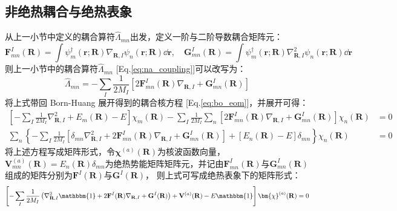 \subsection{非绝热耦合与绝热表象}
从上一小节中定义的耦合算符$\hat{\Lambda}_{mn}$出发，定义一阶与二阶导数耦合矩阵元：
\[\mathbf{F}^I_{mn}(\mathbf{R})=\int\psi_m^{\dagger}(\mathbf{r};\mathbf{R})\nabla_{\mathbf{R},I}\psi_n(\mathbf{r};\mathbf{R})\dd{\mathbf{r}}, \quad \mathbf{G}^I_{mn}(\mathbf{R})=\int\psi_m^{\dagger}(\mathbf{r};\mathbf{R})\nabla_{\mathbf{R},I}^2\psi_n(\mathbf{r};\mathbf{R})\dd{\mathbf{r}}\]
则上一小节中的耦合算符$\hat{\Lambda}_{mn}$ [Eq.\eqref{eq:na_coupling}]可以改写为：
\[\hat{\Lambda}_{mn}=-\sum_I\frac{1}{2M_I}\left[2\mathbf{F}^I_{mn}(\mathbf{R})\nabla_{\mathbf{R},I}+\mathbf{G}^I_{mn}(\mathbf{R})\right]\]
将上式带回 Born-Huang 展开得到的耦合核方程 [Eq.\eqref{eq:bo_eom}]，并展开可得：
\[\begin{aligned}
\left[-\sum_I\frac{1}{2M_I}\nabla^2_{\mathbf{R},I}+E_m(\mathbf{R})-E\right]\chi_m(\mathbf{R})-\sum_I\frac{1}{2M_I}\sum_n\left[2\mathbf{F}^I_{mn}(\mathbf{R})\nabla_{\mathbf{R},I}+\mathbf{G}^I_{mn}(\mathbf{R})\right]\chi_n(\mathbf{R})&=0\\
\sum_n\left\{-\sum_I\frac{1}{2M_I}\left[\delta_{mn}\nabla^2_{\mathbf{R},I}+2\mathbf{F}^I_{mn}(\mathbf{R})\nabla_{\mathbf{R},I}+\mathbf{G}^I_{mn}(\mathbf{R})\right]+\left[E_n(\mathbf{R})-E\right]\delta_{mn}\right\}\chi_n(\mathbf{R})&=0
\end{aligned}\]
将上述方程写成矩阵形式，令$\bm{\chi}^{(a)}(\mathbf{R})$为核波函数向量，$\mathbf{V}^{(a)}_{mn}(\mathbf{R})=E_n(\mathbf{R})\delta_{mn}$为绝热势能矩阵矩阵元，并记由$\mathbf{F}^{I}_{mn}(\mathbf{R})$与$\mathbf{G}^{I}_{mn}(\mathbf{R})$组成的矩阵分别为$\mathbf{F}^{I}(\mathbf{R})$与$\mathbf{G}^{I}(\mathbf{R})$，
则上式可写成绝热表象下的矩阵形式：
\begin{equation}\label{eq:a_eom}
\left[-\sum_I\frac{1}{2M_I}\left(\nabla_{\mathbf{R},I}^2\mathbbm{1}+2\mathbf{F}^{I}(\mathbf{R})\nabla_{\mathbf{R},I}+\mathbf{G}^{I}(\mathbf{R})\right)+\mathbf{V}^{(a)}(\mathbf{R})-E\mathbbm{1}\right]\bm{\chi}^{(a)}(\mathbf{R})=0
\end{equation}


